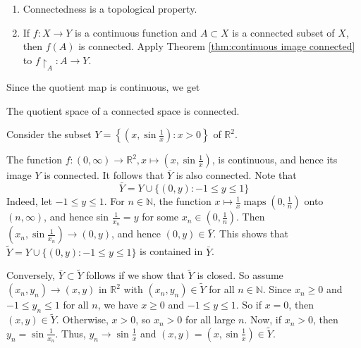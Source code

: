 \documentclass[a4paper]{article}
\begin{document}
\begin{remark}
    \begin{enumerate}
        \item Connectedness is a topological property.
      
        \item If $f: X \rightarrow Y$ is a continuous function and $A \subset X$ is a connected subset of $X$, then $f(A)$ is connected. Apply Theorem \ref{thm:continuous image connected} to $f\restriction_{A}: A \rightarrow Y$.
      \end{enumerate}
\end{remark}

Since the quotient map is continuous, we get
\begin{corollary}
    The quotient space of a connected space is connected.
\end{corollary}

\begin{example}
    Consider the subset $Y=\left\{\left(x, \sin \frac{1}{x}\right): x>0\right\}$ of $\mathbb{R}^{2}$. 
    
    The function $f:(0, \infty) \rightarrow \mathbb{R}^{2}, x \mapsto\left(x, \sin \frac{1}{x}\right)$, is continuous, and hence its image $Y$ is connected. It follows that $\bar{Y}$ is also connected. Note that
    $$
    \bar{Y}=Y \cup\{(0, y):-1 \leqslant y \leqslant 1\}
    $$
    Indeed, let $-1 \leqslant y \leqslant 1$. For $n \in \mathbb{N}$, the function $x \mapsto \frac{1}{x} \operatorname{maps}\left(0, \frac{1}{n}\right)$ onto $(n, \infty)$, and hence sin $\frac{1}{x_{n}}=y$ for some $x_{n} \in\left(0, \frac{1}{n}\right)$. Then $\left(x_{n}, \sin \frac{1}{x_{n}}\right) \rightarrow(0, y)$, and hence $(0, y) \in \bar{Y}$. This shows that $\widetilde{Y}=Y \cup\{(0, y):-1 \leqslant y \leqslant 1\}$ is contained in $\bar{Y}$. 
    
    Conversely, $\bar{Y} \subset \widetilde{Y}$ follows if we show that $\widetilde{Y}$ is closed. So assume $\left(x_{n}, y_{n}\right) \rightarrow(x, y)$ in $\mathbb{R}^{2}$ with $\left(x_{n}, y_{n}\right) \in \widetilde{Y}$ for all $n \in \mathbb{N}$. Since $x_{n} \geqslant 0$ and $-1 \leqslant y_{n} \leqslant 1$ for all $n$, we have $x \geqslant 0$ and $-1 \leqslant y \leqslant 1$. So if $x=0$, then $(x, y) \in \widetilde{Y}$. Otherwise, $x>0$, so $x_{n}>0$ for all large $n$. Now, if $x_{n}>0$, then $y_{n}=\sin \frac{1}{x_{n}}$. Thus, $y_{n} \rightarrow \sin \frac{1}{x}$ and $(x, y)=\left(x, \sin \frac{1}{x}\right) \in \widetilde{Y}$.
\end{example}
\end{document}

